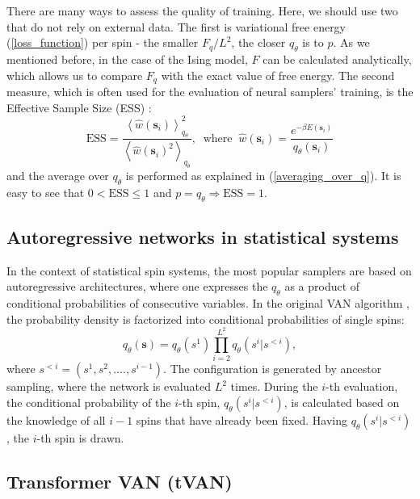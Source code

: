 \documentclass[3p, times,merge]{elsarticle}
\newcommand{\avg}[1]{\left\langle{#1}\right\rangle}
\begin{document}
There are many ways to assess the quality of training. Here, we should use two that do not rely on external data. The first is 
variational free energy (\ref{loss_function}) per spin - the smaller $F_q/L^2$, the closer $q_\theta$ is to $p$. As we mentioned before, in the case of the Ising model, $F$ can be calculated analytically, which allows us to compare $F_q$ with the exact value of free energy. The second measure, which is often used for the evaluation of neural samplers' training, is the Effective Sample Size (ESS) \cite{Liu, Kong}:
\begin{equation}
    \text{ESS}= \frac{\avg{\hat{w}(\mathbf{s}_i)}_{q_\theta}^2}{\avg{\hat{w}(\mathbf{s}_i)^2}_{q_\theta}},\  \textrm{ where } \ \hat w(\mathbf{s}_i) = \frac{e^{-\beta E(\mathbf{s}_i)}}{q_\theta(\mathbf{s}_{i})}
\label{ESS_definition}
\end{equation}
and the average over $q_\theta$ is performed as explained in (\ref{averaging_over_q}). It is easy to see that $0<\text{ESS}\le1$ and $p=q_\theta \Rightarrow \text{ESS}=1$.




\subsection{Autoregressive networks in statistical systems}

In the context of statistical spin systems, the most popular samplers are based on autoregressive architectures, where one expresses the $q_\theta$ as a product of conditional probabilities of consecutive variables. In the original VAN algorithm \cite{2019PhRvL.122h0602W}, the probability density is factorized into conditional probabilities of single spins:
\begin{equation}\label{eq:cond_probs}
    q_\theta(\mathbf{s}) = q_\theta(s^1)\prod_{i=2}^{L^2} q_\theta(s^i| s^{<i}),
\end{equation}
where $s^{<i}=(s^1,s^2,\ldots., s^{i-1})$.
The configuration is generated by ancestor sampling, where the network is evaluated $L^2$ times. During the $i$-th evaluation, the conditional probability of the $i$-th spin, $q_\theta(s^i| s^{<i})$, is calculated based on the knowledge of all $i-1$ spins that have already been fixed. Having $q_\theta(s^i| s^{<i})$, the $i$-th spin is drawn. 





\subsection{Transformer VAN (tVAN)}
\label{tVAN_descript}
\end{document}
